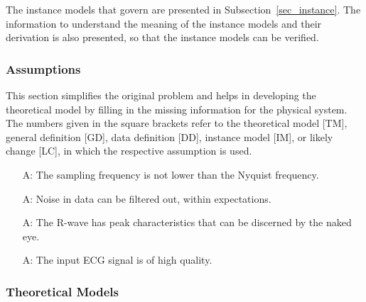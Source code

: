 \documentclass[12pt]{article}
\begin{document}
The instance models that govern \progname{} are presented in
Subsection~\ref{sec_instance}.  The information to understand the meaning of the
instance models and their derivation is also presented, so that the instance
models can be verified.



\subsubsection{Assumptions} \label{sec_assumpt}

This section simplifies the original problem and helps in developing the
theoretical model by filling in the missing information for the physical system.
The numbers given in the square brackets refer to the theoretical model [TM],
general definition [GD], data definition [DD], instance model [IM], or likely
change [LC], in which the respective assumption is used.

\begin{itemize}

\item[A\refstepcounter{assumpnum}\theassumpnum \label{A_Nq_frequency}:] The
sampling frequency is not lower than the Nyquist frequency.

\item[A\refstepcounter{assumpnum}\theassumpnum \label{A_filtered_out}:] Noise in
data can be filtered out, within expectations.

\item[A\refstepcounter{assumpnum}\theassumpnum \label{A_naked_eye}:] The R-wave
has peak characteristics that can be discerned by the naked eye.

\item[A\refstepcounter{assumpnum}\theassumpnum \label{A_high_quality}:] The
input ECG signal is of high quality.

\end{itemize}

\newpage

\subsubsection{Theoretical Models}\label{sec_theoretical}
\end{document}
